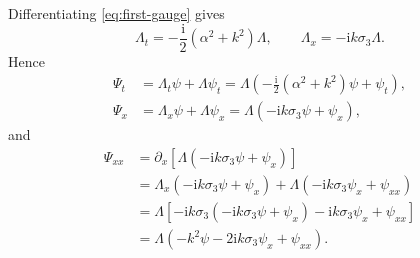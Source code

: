 \documentclass{amsart}
\numberwithin{equation}{hw}
\begin{document}
Differentiating \eqref{eq:first-gauge} gives
\begin{equation}
\Lambda_t
=
-\frac{\mathrm{i}}{2}(\alpha^2+k^2)\Lambda,
\qquad
\Lambda_x
=
-\mathrm{i}k\sigma_3\Lambda.
\label{eq:Lambda-derivatives}
\end{equation}
Hence
\begin{align}
\Psi_t
&=
\Lambda_t\psi+\Lambda\psi_t
=
\Lambda\left(
-\frac{\mathrm{i}}{2}(\alpha^2+k^2)\psi+\psi_t
\right),
\label{eq:Psi-t}
\\
\Psi_x
&=
\Lambda_x\psi+\Lambda\psi_x
=
\Lambda\left(
-\mathrm{i}k\sigma_3\psi+\psi_x
\right),
\label{eq:Psi-x}
\end{align}
and
\begin{align}
\Psi_{xx}
&=
\partial_x\!\left[
\Lambda\left(
-\mathrm{i}k\sigma_3\psi+\psi_x
\right)
\right]
\nonumber\\
&=
\Lambda_x\left(
-\mathrm{i}k\sigma_3\psi+\psi_x
\right)
+
\Lambda\left(
-\mathrm{i}k\sigma_3\psi_x+\psi_{xx}
\right)
\nonumber\\
&=
\Lambda\left[
-\mathrm{i}k\sigma_3
\left(
-\mathrm{i}k\sigma_3\psi+\psi_x
\right)
-\mathrm{i}k\sigma_3\psi_x
+\psi_{xx}
\right]
\nonumber\\
&=
\Lambda\left(
-k^2\psi
-2\mathrm{i}k\sigma_3\psi_x
+\psi_{xx}
\right).
\label{eq:Psi-xx}
\end{align}
\end{document}
